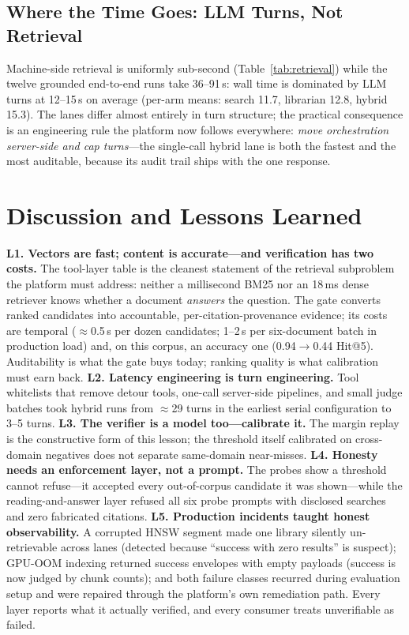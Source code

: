 \documentclass[journal]{IEEEtran}
\begin{document}
\subsection{Where the Time Goes: LLM Turns, Not Retrieval}
\label{sec:composition}
Machine-side retrieval is uniformly sub-second
(Table~\ref{tab:retrieval}) while the twelve grounded end-to-end runs
take 36--91\,s: wall time is dominated by LLM turns at 12--15\,s on
average (per-arm means: search 11.7, librarian 12.8, hybrid 15.3). The
lanes differ almost entirely in turn structure; the practical
consequence is an engineering rule the platform now follows everywhere:
\emph{move orchestration server-side and cap turns}---the single-call
hybrid lane is both the fastest and the most auditable, because its
audit trail ships with the one response.

\section{Discussion and Lessons Learned}
\label{sec:discussion}
\textbf{L1. Vectors are fast; content is accurate---and verification has
two costs.} The tool-layer table is the cleanest statement of the
retrieval subproblem the platform must address: neither a millisecond
BM25 nor an 18\,ms dense retriever knows whether a document
\emph{answers} the question. The gate converts ranked candidates into
accountable, per-citation-provenance evidence; its costs are temporal
($\approx$0.5\,s per dozen candidates; 1--2\,s per six-document batch in
production load) and, on this corpus, an accuracy one
(0.94$\to$0.44 Hit@5). Auditability is what the gate buys today; ranking
quality is what calibration must earn back.
\textbf{L2. Latency engineering is turn engineering.} Tool whitelists
that remove detour tools, one-call server-side pipelines, and small judge
batches took hybrid runs from $\approx$29 turns in the earliest serial
configuration to 3--5 turns.
\textbf{L3. The verifier is a model too---calibrate it.} The margin
replay is the constructive form of this lesson; the threshold itself
calibrated on cross-domain negatives does not separate same-domain
near-misses.
\textbf{L4. Honesty needs an enforcement layer, not a prompt.} The
probes show a threshold cannot refuse---it accepted every out-of-corpus
candidate it was shown---while the reading-and-answer layer refused all
six probe prompts with disclosed searches and zero fabricated citations.
\textbf{L5. Production incidents taught honest observability.} A
corrupted HNSW segment made one library silently un-retrievable across
lanes (detected because ``success with zero results'' is suspect);
GPU-OOM indexing returned success envelopes with empty payloads (success
is now judged by chunk counts); and both failure classes recurred during
evaluation setup and were repaired through the platform's own
remediation path. Every layer reports what it actually verified, and
every consumer treats unverifiable as failed.
\end{document}
